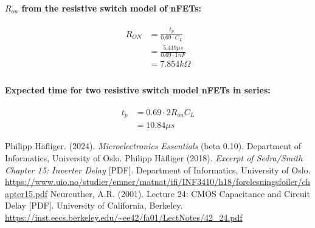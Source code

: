 \documentclass[onecolumn]{article}
\begin{document}
\paragraph{$R_{on}$ from the resistive switch model of nFETs:}
\begin{align}
    R_{ON} &= \frac{t_p}{0.69 \cdot C_L} \nonumber \\
    &= \frac{5.419\mu s}{0.69 \cdot 1 nF} \nonumber \\
    &= 7.854 k\Omega \nonumber \\
\end{align}
\paragraph{Expected time for two resistive switch model nFETs in series:}
\begin{align}
  t_p &= 0.69\cdot 2R_{on}C_L \nonumber \\
  &= 10.84 \mu s \nonumber
\end{align}

\begin{thebibliography}{9}
 Philipp Häfliger. (2024). \textit{Microelectronics Essentials} (beta 0.10). Department of Informatics, University of Oslo.
 Philipp Häfliger (2018). \textit{Excerpt of Sedra/Smith Chapter 15: Inverter Delay} [PDF].  Department of Informatics, University of Oslo. \url{https://www.uio.no/studier/emner/matnat/ifi/INF3410/h18/forelesningsfoiler/chapter15.pdf}
 Neureuther, A.R. (2001). Lecture 24: CMOS Capacitance and Circuit Delay [PDF]. University of California, Berkeley. \url{https://inst.eecs.berkeley.edu/~ee42/fa01/LectNotes/42_24.pdf}
\end{thebibliography}
\end{document}

